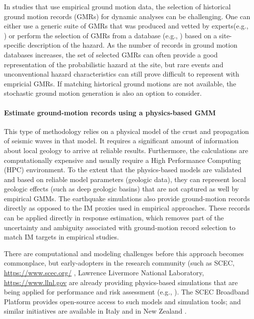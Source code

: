 In studies that use empirical ground motion data, the selection of historical ground motion records (GMRs) for dynamic analyses can be challenging. One can either use a generic suite of GMRs that was produced and vetted by experts(e.g., \cite{baker2011new}) or perform the selection of GMRs from a database (e.g., \cite{ancheta2014ngawest2}) based on a site-specific description of the hazard. As the number of records in ground motion databases increases, the set of selected GMRs can often provide a good representation of the probabilistic hazard at the site, but rare events and unconventional hazard characteristics can still prove difficult to represent with empricial GMRs. If matching historical ground motions are not available, the stochastic ground motion generation is also an option to consider.

\paragraph{Estimate ground-motion records using a physics-based GMM} This type of methodology relies on a physical model of the crust and propagation of seismic waves in that model. It requires a significant amount of information about local geology to arrive at reliable results. Furthermore, the calculations are computationally expensive and usually require a High Performance Computing (HPC) environment. To the extent that the physics-based models are validated and based on reliable model parameters (geologic data), they can represent local geologic effects (such as deep geologic basins) that are not captured as well by empirical GMMs. The earthquake simulations also provide ground-motion records directly as opposed to the IM proxies used in empirical approaches. These records can be applied directly in response estimation, which removes part of the uncertainty and ambiguity associated with ground-motion record selection to match IM targets in empirical studies. 

There are computational and modeling challenges before this approach becomes commonplace, but early-adopters in the research community (such as SCEC, \url{https://www.scec.org/} , Lawrence Livermore National Laboratory, \url{https://www.llnl.gov} are already providing physics-based simulations that are being applied for performance and risk assessment (e.g., \cite{frankel2018broadband, rodgers2019effect}). The SCEC Broadband Platform \citep{maechling2015scec} provides open-source access to such models and simulation tools; and similar initiatives are available in Italy \citep{damico2017synthesis} and in New Zealand \citep{bradley2017guidance}. 

